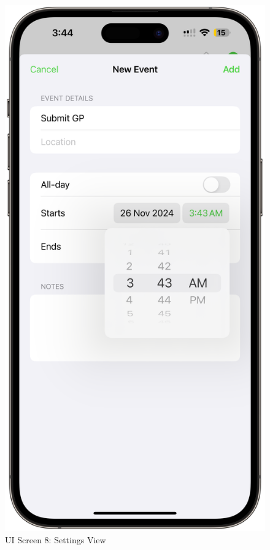\begin{figure}[!h]
\begin{minipage}{0.3\textwidth}
        \includegraphics[width=\textwidth]{images/screen8.png}
        \caption{UI Screen 8: Settings View}
        \label{fig:ui-screen-8}
    \end{minipage}
\end{figure}

